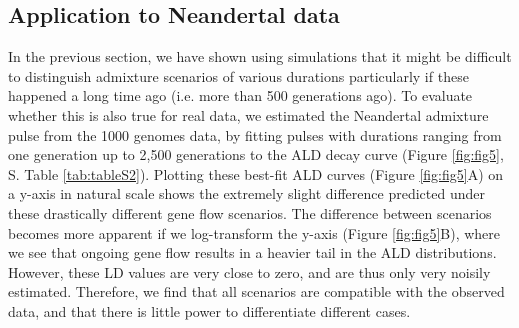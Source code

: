 \documentclass[]{article}
\begin{document}
\subsection{Application to Neandertal data}

In the previous section, we have shown using simulations that it might be difficult to distinguish admixture scenarios of various durations particularly if these happened a long time ago (i.e. more than 500 generations ago). To evaluate whether this is also true for real data, we estimated the Neandertal admixture pulse from the 1000 genomes data, by fitting pulses with durations ranging from one generation up to 2,500 generations to the ALD decay curve (Figure \ref{fig:fig5}, S. Table \ref{tab:tableS2}). Plotting these best-fit ALD curves (Figure \ref{fig:fig5}A) on a y-axis in natural scale shows the extremely slight difference predicted under these drastically different gene flow scenarios. The difference between scenarios becomes more apparent if we log-transform the y-axis (Figure \ref{fig:fig5}B), where we see that ongoing gene flow results in a heavier tail in the ALD distributions. However, these LD values are very close to zero, and are thus only very noisily estimated. Therefore, we find that all scenarios are compatible with the observed data, and that there is little power to differentiate different cases.
\end{document}
